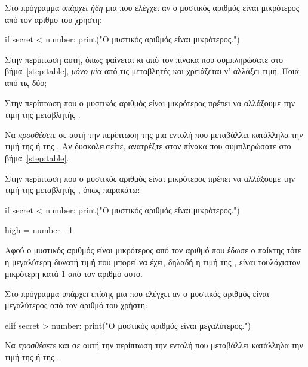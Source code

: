 \documentclass[a4paper,11pt,oneside]{book}
\begin{document}
\begin{step}
Στο πρόγραμμα \emph{υπάρχει ήδη} μια  που ελέγχει αν ο μυστικός αριθμός είναι μικρότερος από τον αριθμό του χρήστη:

\begin{pyplain}
    if secret < number:
        print("Ο μυστικός αριθμός είναι μικρότερος.")
\end{pyplain}

Στην περίπτωση αυτή, όπως φαίνεται κι από τον πίνακα που συμπληρώσατε στο βήμα~\ref{step:table}, \emph{μόνο μία} από τις μεταβλητές  και  χρειάζεται ν' αλλάξει τιμή. Ποιά από τις δύο;

\begin{answer}
Στην περίπτωση που ο μυστικός αριθμός είναι μικρότερος πρέπει να αλλάξουμε την τιμή της μεταβλητής . 
\end{answer}

Να \emph{προσθέσετε} σε αυτή την περίπτωση της  μια εντολή που μεταβάλλει κατάλληλα την τιμή της  ή της . Αν δυσκολευτείτε, ανατρέξτε στον πίνακα που συμπληρώσατε στο βήμα~\ref{step:table}.

\begin{answer}
Στην περίπτωση που ο μυστικός αριθμός είναι μικρότερος πρέπει να αλλάξουμε την τιμή της μεταβλητής , όπως παρακάτω:

\begin{pyplain}
    if secret < number:
        print("Ο μυστικός αριθμός είναι μικρότερος.")
\end{pyplain}
\begin{pynew}
        high = number - 1
\end{pynew}

Αφού ο μυστικός αριθμός είναι μικρότερος από τον αριθμό που έδωσε ο παίκτης τότε η μεγαλύτερη δυνατή τιμή που μπορεί να έχει, δηλαδή η τιμή της , είναι τουλάχιστον μικρότερη κατά 1 από τον αριθμό αυτό. 
\end{answer}

Στο πρόγραμμα υπάρχει επίσης μια  που ελέγχει αν ο μυστικός αριθμός είναι μεγαλύτερος από τον αριθμό του χρήστη:

\begin{pyplain}
    elif secret > number:
        print("Ο μυστικός αριθμός είναι μεγαλύτερος.")
\end{pyplain}

Να \emph{προσθέσετε} και σε αυτή την περίπτωση την εντολή που μεταβάλλει κατάλληλα την τιμή της  ή της . 


\end{step}
\end{document}
